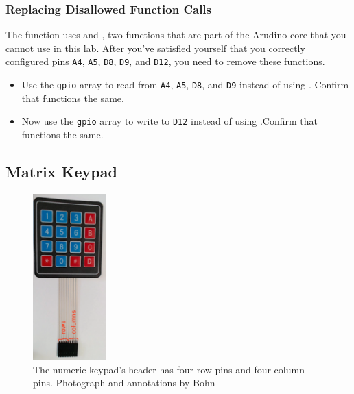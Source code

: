 \subsubsection{Replacing Disallowed Function Calls}

The  function uses  and
, two functions that are part of the Arudino core that
you cannot use in this lab. After you've satisfied yourself that you correctly
configured pins \texttt{A4}, \texttt{A5}, \texttt{D8}, \texttt{D9}, and
\texttt{D12}, you need to remove these functions.

    \begin{itemize}
    \item Use the \lstinline{gpio} array to read from \texttt{A4}, \texttt{A5},
        \texttt{D8}, and \texttt{D9} instead of using .
        Confirm that  functions the same.
    \item Now use the \lstinline{gpio} array to write to \texttt{D12} instead of
        using .Confirm that 
        functions the same.
    \end{itemize}

\subsection{Matrix Keypad}

\begin{figure}
    \centering
    \includegraphics[width=0.25\textwidth]{keypad-annotated}
    \caption{The numeric keypad's header has four row pins and four column pins. \tiny Photograph and annotations by Bohn \label{fig:keypad-annotated}}
\end{figure}


